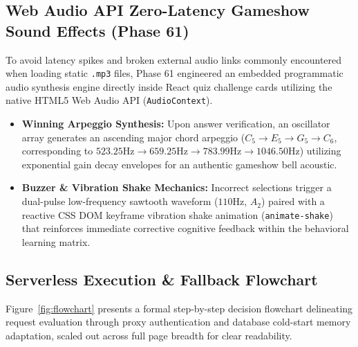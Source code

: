 \documentclass[12pt,a4paper]{article}
\begin{document}
\subsection{Web Audio API Zero-Latency Gameshow Sound Effects (Phase 61)}
To avoid latency spikes and broken external audio links commonly encountered when loading static \texttt{.mp3} files, Phase 61 engineered an embedded programmatic audio synthesis engine directly inside React quiz challenge cards utilizing the native HTML5 Web Audio API (\texttt{AudioContext}).
\begin{itemize}
    \item \textbf{Winning Arpeggio Synthesis:} Upon answer verification, an oscillator array generates an ascending major chord arpeggio ($C_5 \rightarrow E_5 \rightarrow G_5 \rightarrow C_6$, corresponding to $523.25\text{Hz} \rightarrow 659.25\text{Hz} \rightarrow 783.99\text{Hz} \rightarrow 1046.50\text{Hz}$) utilizing exponential gain decay envelopes for an authentic gameshow bell acoustic.
    \item \textbf{Buzzer \& Vibration Shake Mechanics:} Incorrect selections trigger a dual-pulse low-frequency sawtooth waveform ($110\text{Hz}$, $A_2$) paired with a reactive CSS DOM keyframe vibration shake animation (\texttt{animate-shake}) that reinforces immediate corrective cognitive feedback within the behavioral learning matrix.
\end{itemize}

\subsection{Serverless Execution \& Fallback Flowchart}
Figure~\ref{fig:flowchart} presents a formal step-by-step decision flowchart delineating request evaluation through proxy authentication and database cold-start memory adaptation, scaled out across full page breadth for clear readability.
\end{document}
